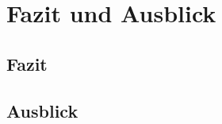 
\chapter{Fazit und Ausblick}
\label{chap:fazit}

\section{Fazit}%
\label{sec:fazit}

\section{Ausblick}%
\label{sec:ausblick}
